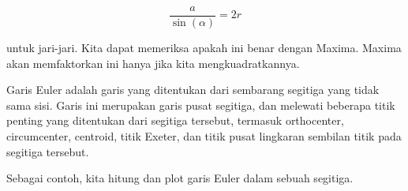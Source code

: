 \documentclass[a4paper,10pt]{article}
\begin{document}
\begin{eulernotebook}
\begin{eulercomment}
\begin{eulercomment}
\begin{eulercomment}
\begin{eulercomment}
\begin{eulercomment}
\begin{eulercomment}
\begin{eulercomment}
\begin{eulercomment}
\begin{eulercomment}
\begin{eulercomment}
\begin{eulercomment}
\begin{eulercomment}
\begin{eulercomment}
\begin{eulercomment}
\begin{eulercomment}
\begin{eulercomment}
\begin{eulercomment}
\begin{eulercomment}
\begin{eulercomment}
\begin{eulercomment}
\begin{eulercomment}
\begin{eulercomment}
\begin{eulercomment}
\begin{eulercomment}
\begin{eulercomment}
\begin{eulercomment}
\begin{eulercomment}
\begin{eulercomment}
\begin{eulercomment}
\begin{eulercomment}
\begin{eulercomment}
\end{eulercomment}
\begin{eulerformula}
\[
\frac{a}{\sin(\alpha)}=2r
\]
\end{eulerformula}
\begin{eulercomment}
untuk jari-jari. Kita dapat memeriksa apakah ini benar dengan Maxima.
Maxima akan memfaktorkan ini hanya jika kita mengkuadratkannya.
\end{eulercomment}
\begin{eulercomment}
Garis Euler adalah garis yang ditentukan dari sembarang segitiga yang
tidak sama sisi. Garis ini merupakan garis pusat segitiga, dan
melewati beberapa titik penting yang ditentukan dari segitiga
tersebut, termasuk orthocenter, circumcenter, centroid, titik Exeter,
dan titik pusat lingkaran sembilan titik pada segitiga tersebut.

Sebagai contoh, kita hitung dan plot garis Euler dalam sebuah
segitiga.


\end{eulercomment}
\end{eulercomment}
\end{eulercomment}
\end{eulercomment}
\end{eulercomment}
\end{eulercomment}
\end{eulercomment}
\end{eulercomment}
\end{eulercomment}
\end{eulercomment}
\end{eulercomment}
\end{eulercomment}
\end{eulercomment}
\end{eulercomment}
\end{eulercomment}
\end{eulercomment}
\end{eulercomment}
\end{eulercomment}
\end{eulercomment}
\end{eulercomment}
\end{eulercomment}
\end{eulercomment}
\end{eulercomment}
\end{eulercomment}
\end{eulercomment}
\end{eulercomment}
\end{eulercomment}
\end{eulercomment}
\end{eulercomment}
\end{eulercomment}
\end{eulercomment}
\end{eulernotebook}
\end{document}
